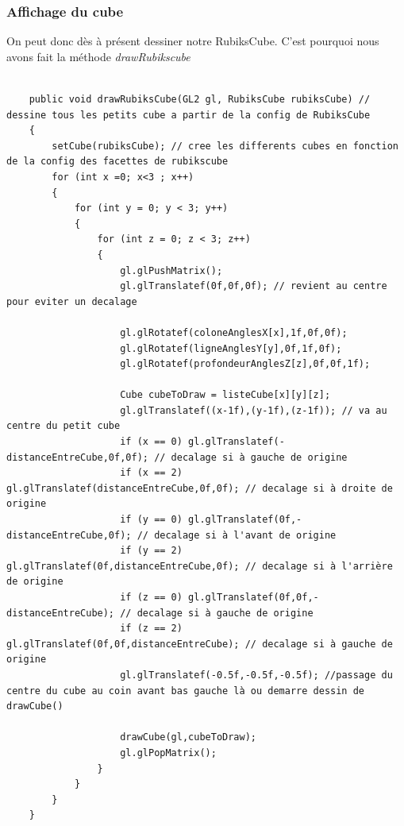 \subsubsection{Affichage du cube}
On peut donc dès à présent dessiner notre RubiksCube. C’est pourquoi nous avons fait la méthode \textit{drawRubikscube} 
\begin{lstlisting}[frame=single]  % Start your code-block

    public void drawRubiksCube(GL2 gl, RubiksCube rubiksCube) // dessine tous les petits cube a partir de la config de RubiksCube
    {
        setCube(rubiksCube); // cree les differents cubes en fonction de la config des facettes de rubikscube
        for (int x =0; x<3 ; x++)
        {
            for (int y = 0; y < 3; y++)
            {
                for (int z = 0; z < 3; z++)
                {
                    gl.glPushMatrix();
                    gl.glTranslatef(0f,0f,0f); // revient au centre pour eviter un decalage

                    gl.glRotatef(coloneAnglesX[x],1f,0f,0f);
                    gl.glRotatef(ligneAnglesY[y],0f,1f,0f);
                    gl.glRotatef(profondeurAnglesZ[z],0f,0f,1f);

                    Cube cubeToDraw = listeCube[x][y][z];
                    gl.glTranslatef((x-1f),(y-1f),(z-1f)); // va au centre du petit cube
                    if (x == 0) gl.glTranslatef(-distanceEntreCube,0f,0f); // decalage si à gauche de origine
                    if (x == 2) gl.glTranslatef(distanceEntreCube,0f,0f); // decalage si à droite de origine
                    if (y == 0) gl.glTranslatef(0f,-distanceEntreCube,0f); // decalage si à l'avant de origine
                    if (y == 2) gl.glTranslatef(0f,distanceEntreCube,0f); // decalage si à l'arrière de origine
                    if (z == 0) gl.glTranslatef(0f,0f,-distanceEntreCube); // decalage si à gauche de origine
                    if (z == 2) gl.glTranslatef(0f,0f,distanceEntreCube); // decalage si à gauche de origine
                    gl.glTranslatef(-0.5f,-0.5f,-0.5f); //passage du centre du cube au coin avant bas gauche là ou demarre dessin de drawCube()

                    drawCube(gl,cubeToDraw);
                    gl.glPopMatrix();
                }
            }
        }
    }

\end{lstlisting}


